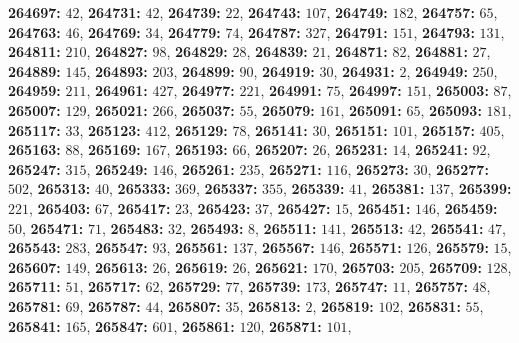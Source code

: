 \textsf{\bfseries 264697:} $42$, \textsf{\bfseries 264731:} $42$, \textsf{\bfseries 264739:} $22$, \textsf{\bfseries 264743:} $107$, \textsf{\bfseries 264749:} $182$, \textsf{\bfseries 264757:} $65$, \textsf{\bfseries 264763:} $46$, \textsf{\bfseries 264769:} $34$, \textsf{\bfseries 264779:} $74$, \textsf{\bfseries 264787:} $327$, \textsf{\bfseries 264791:} $151$, \textsf{\bfseries 264793:} $131$, \textsf{\bfseries 264811:} $210$, \textsf{\bfseries 264827:} $98$, \textsf{\bfseries 264829:} $28$, \textsf{\bfseries 264839:} $21$, \textsf{\bfseries 264871:} $82$, \textsf{\bfseries 264881:} $27$, \textsf{\bfseries 264889:} $145$, \textsf{\bfseries 264893:} $203$, \textsf{\bfseries 264899:} $90$, \textsf{\bfseries 264919:} $30$, \textsf{\bfseries 264931:} $2$, \textsf{\bfseries 264949:} $250$, \textsf{\bfseries 264959:} $211$, \textsf{\bfseries 264961:} $427$, \textsf{\bfseries 264977:} $221$, \textsf{\bfseries 264991:} $75$, \textsf{\bfseries 264997:} $151$, \textsf{\bfseries 265003:} $87$, \textsf{\bfseries 265007:} $129$, \textsf{\bfseries 265021:} $266$, \textsf{\bfseries 265037:} $55$, \textsf{\bfseries 265079:} $161$, \textsf{\bfseries 265091:} $65$, \textsf{\bfseries 265093:} $181$, \textsf{\bfseries 265117:} $33$, \textsf{\bfseries 265123:} $412$, \textsf{\bfseries 265129:} $78$, \textsf{\bfseries 265141:} $30$, \textsf{\bfseries 265151:} $101$, \textsf{\bfseries 265157:} $405$, \textsf{\bfseries 265163:} $88$, \textsf{\bfseries 265169:} $167$, \textsf{\bfseries 265193:} $66$, \textsf{\bfseries 265207:} $26$, \textsf{\bfseries 265231:} $14$, \textsf{\bfseries 265241:} $92$, \textsf{\bfseries 265247:} $315$, \textsf{\bfseries 265249:} $146$, \textsf{\bfseries 265261:} $235$, \textsf{\bfseries 265271:} $116$, \textsf{\bfseries 265273:} $30$, \textsf{\bfseries 265277:} $502$, \textsf{\bfseries 265313:} $40$, \textsf{\bfseries 265333:} $369$, \textsf{\bfseries 265337:} $355$, \textsf{\bfseries 265339:} $41$, \textsf{\bfseries 265381:} $137$, \textsf{\bfseries 265399:} $221$, \textsf{\bfseries 265403:} $67$, \textsf{\bfseries 265417:} $23$, \textsf{\bfseries 265423:} $37$, \textsf{\bfseries 265427:} $15$, \textsf{\bfseries 265451:} $146$, \textsf{\bfseries 265459:} $50$, \textsf{\bfseries 265471:} $71$, \textsf{\bfseries 265483:} $32$, \textsf{\bfseries 265493:} $8$, \textsf{\bfseries 265511:} $141$, \textsf{\bfseries 265513:} $42$, \textsf{\bfseries 265541:} $47$, \textsf{\bfseries 265543:} $283$, \textsf{\bfseries 265547:} $93$, \textsf{\bfseries 265561:} $137$, \textsf{\bfseries 265567:} $146$, \textsf{\bfseries 265571:} $126$, \textsf{\bfseries 265579:} $15$, \textsf{\bfseries 265607:} $149$, \textsf{\bfseries 265613:} $26$, \textsf{\bfseries 265619:} $26$, \textsf{\bfseries 265621:} $170$, \textsf{\bfseries 265703:} $205$, \textsf{\bfseries 265709:} $128$, \textsf{\bfseries 265711:} $51$, \textsf{\bfseries 265717:} $62$, \textsf{\bfseries 265729:} $77$, \textsf{\bfseries 265739:} $173$, \textsf{\bfseries 265747:} $11$, \textsf{\bfseries 265757:} $48$, \textsf{\bfseries 265781:} $69$, \textsf{\bfseries 265787:} $44$, \textsf{\bfseries 265807:} $35$, \textsf{\bfseries 265813:} $2$, \textsf{\bfseries 265819:} $102$, \textsf{\bfseries 265831:} $55$, \textsf{\bfseries 265841:} $165$, \textsf{\bfseries 265847:} $601$, \textsf{\bfseries 265861:} $120$, \textsf{\bfseries 265871:} $101$, 
